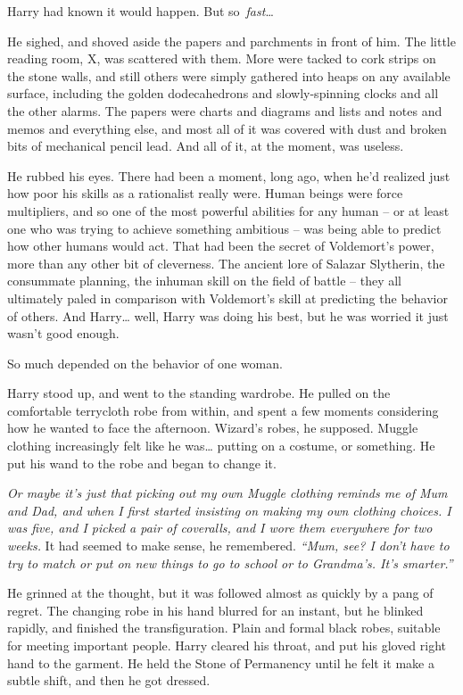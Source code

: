 Harry had known it would happen. But so~\emph{fast}\ldots{}

He sighed, and shoved aside the papers and parchments in front of him.
The little reading room, X, was scattered with them. More were tacked to
cork strips on the stone walls, and still others were simply gathered
into heaps on any available surface, including the golden dodecahedrons
and slowly-spinning clocks and all the other alarms. The papers were
charts and diagrams and lists and notes and memos and everything else,
and most all of it was covered with dust and broken bits of mechanical
pencil lead. And all of it, at the moment, was useless.

He rubbed his eyes. There had been a moment, long ago, when he'd
realized just how poor his skills as a rationalist really were. Human
beings were force multipliers, and so one of the most powerful abilities
for any human -- or at least one who was trying to achieve something
ambitious -- was being able to predict how other humans would act. That
had been the secret of Voldemort's power, more than any other bit of
cleverness. The ancient lore of Salazar Slytherin, the consummate
planning, the inhuman skill on the field of battle -- they all
ultimately paled in comparison with Voldemort's skill at predicting the
behavior of others. And Harry\ldots{} well, Harry was doing his best,
but he was worried it just wasn't good enough.

So much depended on the behavior of one woman.

Harry stood up, and went to the standing wardrobe. He pulled on the
comfortable terrycloth robe from within, and spent a few moments
considering how he wanted to face the afternoon. Wizard's robes, he
supposed. Muggle clothing increasingly felt like he was\ldots{} putting
on a costume, or something. He put his wand to the robe and began to
change it.

\emph{Or maybe it's just that picking out my own Muggle clothing reminds
me of Mum and Dad, and when I first started insisting on making my own
clothing choices. I was five, and I picked a pair of coveralls, and I
wore them everywhere for two weeks.} It had seemed to make sense, he
remembered. \emph{``Mum, see? I don't have to try to match or put on new
things to go to school or to Grandma's. It's smarter.''}

He grinned at the thought, but it was followed almost as quickly by a
pang of regret. The changing robe in his hand blurred for an instant,
but he blinked rapidly, and finished the transfiguration. Plain and
formal black robes, suitable for meeting important people. Harry cleared
his throat, and put his gloved right hand to the garment. He held the
Stone of Permanency until he felt it make a subtle shift, and then he
got dressed.

